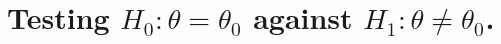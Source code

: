 \chapter{Testing \texorpdfstring{$H_0:\theta = \theta_0$}{h0} against \texorpdfstring{$H_1:\theta
  \neq \theta_0$}{h1}.}
